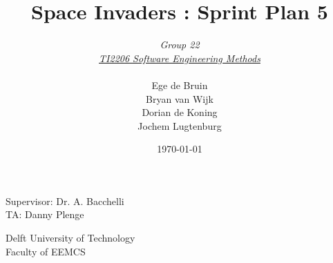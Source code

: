 \documentclass[10pt]{article}
\begin{document}
\title{Space Invaders : Sprint Plan 5}
\date{\today}
\author{\textit{Group 22}\\ \textit{\underline{TI2206 Software Engineering Methods}} \\
 \\Ege de Bruin \\ Bryan van Wijk \\ Dorian de Koning \\ Jochem Lugtenburg }
 \maketitle  
 \begin{center}
Supervisor: Dr. A. Bacchelli\\
TA: Danny Plenge\\
 \end{center}     
 \begin{center}
 Delft University of Technology\\
 Faculty of EEMCS\\
 \end{center}
 \thispagestyle{empty}
 \pagebreak
 
\end{document}
